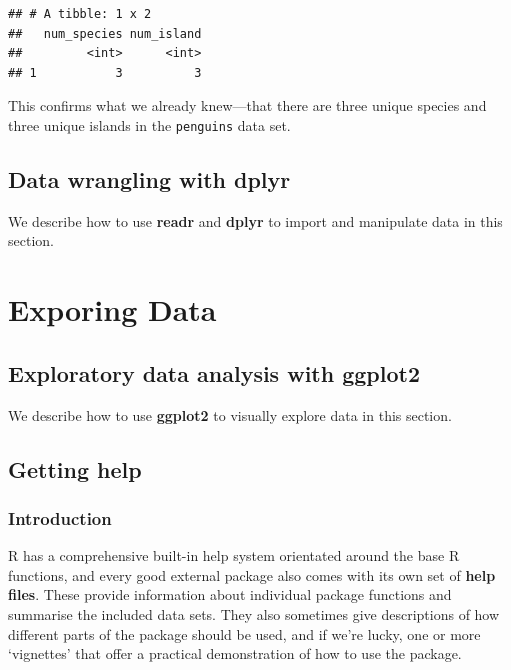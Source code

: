 \documentclass[
]{book}
\begin{document}
\begin{verbatim}
## # A tibble: 1 x 2
##   num_species num_island
##         <int>      <int>
## 1           3          3
\end{verbatim}

This confirms what we already knew---that there are three unique species and three unique islands in the \texttt{penguins} data set.

\hypertarget{data-wrangling-with-dplyr}{%
\chapter{\texorpdfstring{Data wrangling with \textbf{dplyr}}{Data wrangling with dplyr}}\label{data-wrangling-with-dplyr}}

We describe how to use \textbf{readr} and \textbf{dplyr} to import and manipulate data in this section.

\hypertarget{part-exporing-data}{%
\part{Exporing Data}\label{part-exporing-data}}

\hypertarget{exploratory-data-analysis-with-ggplot2}{%
\chapter{\texorpdfstring{Exploratory data analysis with \textbf{ggplot2}}{Exploratory data analysis with ggplot2}}\label{exploratory-data-analysis-with-ggplot2}}

We describe how to use \textbf{ggplot2} to visually explore data in this section.

\hypertarget{appendix-supplementary-material}{%
\appendix}


\hypertarget{getting-help}{%
\chapter{Getting help}\label{getting-help}}

\hypertarget{console-help}{%
\section{Introduction}\label{console-help}}

R has a comprehensive built-in help system orientated around the base R functions, and every good external package also comes with its own set of \textbf{help files}. These provide information about individual package functions and summarise the included data sets. They also sometimes give descriptions of how different parts of the package should be used, and if we're lucky, one or more `vignettes' that offer a practical demonstration of how to use the package.
\end{document}
